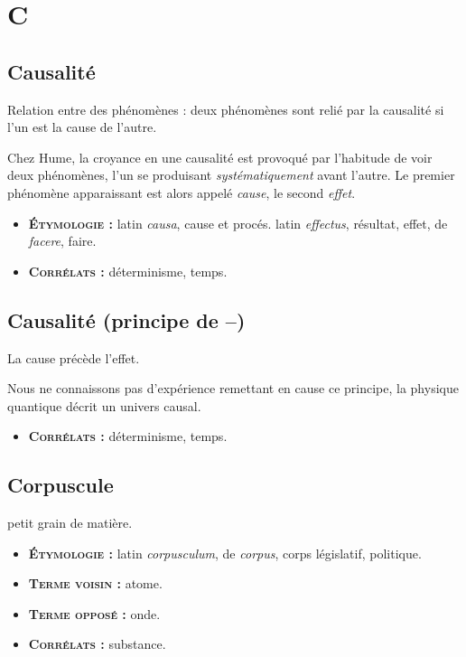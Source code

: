 \chapter{C}
%
\section{Causalité}

Relation entre des phénomènes : deux phénomènes sont relié par
la causalité si l'un est la cause de l'autre.

Chez Hume, la croyance en une causalité est provoqué par l'habitude de voir deux phénomènes, l'un se produisant {\it systématiquement} avant l'autre. Le premier phénomène apparaissant est alors appelé {\it cause}, le second {\it effet}.

{\footnotesize
\begin{itemize}[leftmargin=1cm, label=, itemsep=1pt]
\item {\bf \textsc{Étymologie} :} latin {\it causa}, cause et
procés. latin {\it effectus}, résultat, effet, de {\it facere}, faire.
\item {\bf \textsc{Corrélats} :} déterminisme, temps.
\end{itemize}
}

%
\section{Causalité (principe de {\bf --})}

La cause précède l'effet.

Nous ne connaissons pas d'expérience remettant en cause ce
principe, la physique quantique décrit un univers causal.
{\footnotesize
\begin{itemize}[leftmargin=1cm, label=, itemsep=1pt]
\item {\bf \textsc{Corrélats} :} déterminisme, temps.
\end{itemize}
}

%
\section{Corpuscule}

petit grain de matière.
{\footnotesize
\begin{itemize}[leftmargin=1cm, label=, itemsep=1pt]
\item {\bf \textsc{Étymologie} :} latin {\it corpusculum}, de {\it corpus}, corps législatif, politique.
\item {\bf \textsc{Terme voisin} :} atome.
\item {\bf \textsc{Terme opposé} :} onde.
\item {\bf \textsc{Corrélats} :} substance.
\end{itemize}
}

